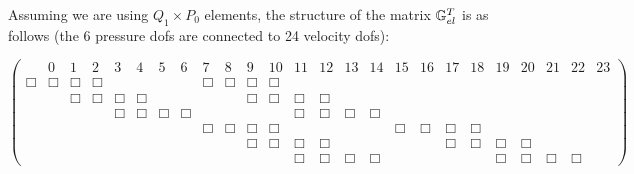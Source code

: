Assuming we are using $Q_1\times P_0$ elements, the structure of the matrix ${\mathbb{G}}_{el}^T$ is as follows
(the 6 pressure dofs are connected to 24 velocity dofs):

\begin{scriptsize}
\begin{equation}
\left(
\begin{array}{ccccccccccccccccccccccccc}
&0 & 1 & 2 & 3 & 4 & 5 & 6 & 7 & 8 & 9 & 10 & 11 & 12 & 13 & 14 & 15 & 16 & 17 & 18 & 19 & 20 & 21 & 22 & 23     \\
\Box&\Box & \Box&\Box &  &  &  &  & \Box&\Box & \Box&\Box &  &  &  &  &  &  &  &  &  &  &  &  \\
    &     & \Box&\Box & \Box&\Box &  &  &  &  & \Box&\Box & \Box&\Box &  &  &  &  &  &  &  &  &  &  \\
 & &     &     & \Box&\Box & \Box&\Box &  &  &  &  & \Box&\Box & \Box&\Box &  &  &  &  &  &  &  &    \\
 & & & &  & &     &     & \Box&\Box & \Box&\Box &  &  &  &  & \Box&\Box & \Box&\Box &  &  &  &      \\
 & & & & & &  & &     &     & \Box&\Box & \Box&\Box &  &  &  &  & \Box&\Box & \Box&\Box &  &       \\
 & &  & & & & & &  & &     &     & \Box&\Box & \Box&\Box &  &  &  &  & \Box&\Box & \Box&\Box        
\end{array}
\right)
\end{equation} 
\end{scriptsize}

